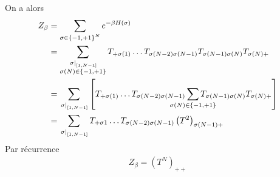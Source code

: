 \documentclass[french]{beamer}
\begin{document}
\begin{frame}
On a alors
\begin{align*}
Z_\beta &= \sum_{\sigma \in \left\{-1, +1\right\}^N} e^{-\beta H(\sigma)} \\
&=\sum_{\substack{\left.\sigma\right|_{\left[1, N-1\right]} \\ \sigma(N) \in \left\{-1, +1\right\}}}  T_{+\sigma(1)} \dots T_{\sigma(N-2)\sigma(N-1)}T_{\sigma(N-1)\sigma(N)} T_{\sigma(N)+} \\
&= \sum_{\left.\sigma\right|_{\left[1, N-1\right]}}  \left[ T_{+\sigma(1)} \dots T_{\sigma(N-2)\sigma(N-1)} \sum_{\mathclap{\sigma(N) \in \left\{-1, +1\right\}}} T_{\sigma(N-1)\sigma(N)} T_{\sigma(N)+} \right] \\
&= \sum_{\left.\sigma\right|_{\left[1, N-1\right]}} T_{+\sigma1}\dots T_{\sigma(N-2)\sigma(N-1)} \left(T^2\right)_{\sigma(N-1)+}
\end{align*}
Par récurrence
\begin{align*}
    Z_\beta = (T^N)_ {++}
\end{align*}
\end{frame}
\end{document}
